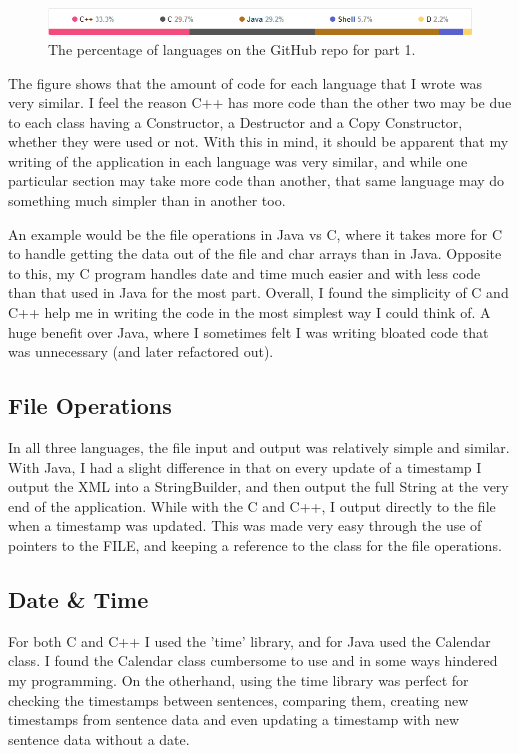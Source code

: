 \documentclass{article}
\begin{document}
\begin{figure}[h!]
  \caption{The percentage of languages on the GitHub repo for part 1.}
  \centering
    \includegraphics[width=1\textwidth]{img/percentages}
\end{figure}

The figure shows that the amount of code for each language that I wrote was very similar. I feel the reason C++ has more code than the other two may be due to each class having a Constructor, a Destructor and a Copy Constructor, whether they were used or not. With this in mind, it should be apparent that my writing of the application in each language was very similar, and while one particular section may take more code than another, that same language may do something much simpler than in another too.

An example would be the file operations in Java vs C, where it takes more for C to handle getting the data out of the file and char arrays than in Java. Opposite to this, my C program handles date and time much easier and with less code than that used in Java for the most part. Overall, I found the simplicity of C and C++ help me in writing the code in the most simplest way I could think of. A huge benefit over Java, where I sometimes felt I was writing bloated code that was unnecessary (and later refactored out).

\subsection{File Operations}

In all three languages, the file input and output was relatively simple and similar. With Java, I had a slight difference in that on every update of a timestamp I output the XML into a StringBuilder, and then output the full String at the very end of the application. While with the C and C++, I output directly to the file when a timestamp was updated. This was made very easy through the use of pointers to the FILE, and keeping a reference to the class for the file operations.

\subsection{Date \& Time}

For both C and C++ I used the 'time' library\cite{time}, and for Java used the Calendar class. I found the Calendar class cumbersome to use and in some ways hindered my programming. On the otherhand, using the time library was perfect for checking the timestamps between sentences, comparing them, creating new timestamps from sentence data and even updating a timestamp with new sentence data without a date. 
\end{document}
